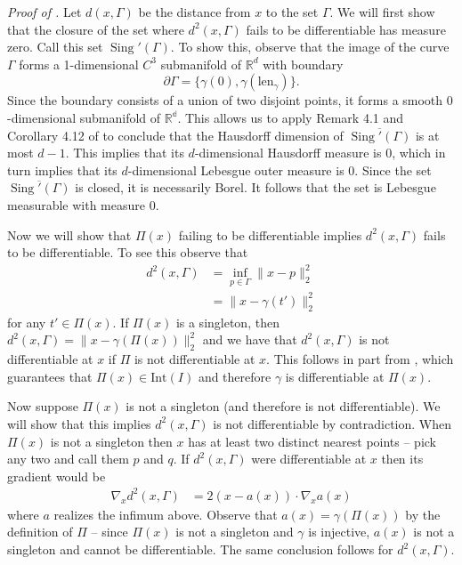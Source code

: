 \documentclass[11pt]{article}
\begin{document}
\textit{Proof of .} Let $d(x, \Gamma)$ be the distance from $x$ to the set $\Gamma$. We will first show that the closure of the set where $d^2(x,\Gamma)$ fails to be differentiable has measure zero. Call this set $\operatorname{Sing}'(\Gamma)$. To show this, observe that the image of the curve $\Gamma$ forms a 1-dimensional $C^3$ submanifold of $\mathbb{R}^d$ with boundary
\[\partial\Gamma = \{\gamma(0), \gamma(\text{len}_{\gamma})\}.\]
Since the boundary consists of a union of two disjoint points, it forms a smooth $0$-dimensional submanifold of $\mathbb{R^d}$. This allows us to apply Remark 4.1 and Corollary 4.12 of \citet{mantegazza2002hamilton} to conclude that the Hausdorff dimension of $\overline{\operatorname{Sing}'(\Gamma)}$ is at most $d-1$. This implies that its $d$-dimensional Hausdorff measure is $0$, which in turn implies that its $d$-dimensional Lebesgue outer measure is $0$. Since the set $\overline{\operatorname{Sing}'(\Gamma)}$ is closed, it is necessarily Borel. It follows that the set is Lebesgue measurable with measure $0$. 

Now we will show that $\Pi(x)$ failing to be differentiable implies $d^2(x, \Gamma)$ fails to be differentiable. To see this observe that
\begin{align}
    d^2(x, \Gamma) &= \inf_{p \in \Gamma}\|x - p\|_2^2 \\ \label{eq: distance to Gamma}
    &= \|x - \gamma(t')\|_2^2
\end{align}
for any $t' \in \Pi(x)$. If $\Pi(x)$ is a singleton, then $d^2(x,\Gamma) = \|x - \gamma(\Pi(x))\|_2^2$ and we have that $d^2(x,\Gamma)$ is not differentiable at $x$ if $\Pi$ is not differentiable at $x$. This follows in part from , which guarantees that $\Pi(x) \in \text{Int}(I)$ and therefore $\gamma$ is differentiable at $\Pi(x)$.

Now suppose $\Pi(x)$ is not a singleton (and therefore is not differentiable). We will show that this implies $d^2(x,\Gamma)$ is not differentiable by contradiction. When $\Pi(x)$ is not a singleton then $x$ has at least two distinct nearest points -- pick any two and call them $p$ and $q$. If $d^2(x,\Gamma)$ were differentiable at $x$ then its gradient would be 
\begin{align}
    \nabla_xd^2(x, \Gamma) &= 2(x - a(x))\cdot \nabla_xa(x)
\end{align}
where $a$ realizes the infimum above. Observe that $a(x) = \gamma(\Pi(x))$ by the definition of $\Pi$ -- since $\Pi(x)$ is not a singleton and $\gamma$ is injective, $a(x)$ is not a singleton and cannot be differentiable. The same conclusion follows for $d^2(x, \Gamma).$
\end{document}
